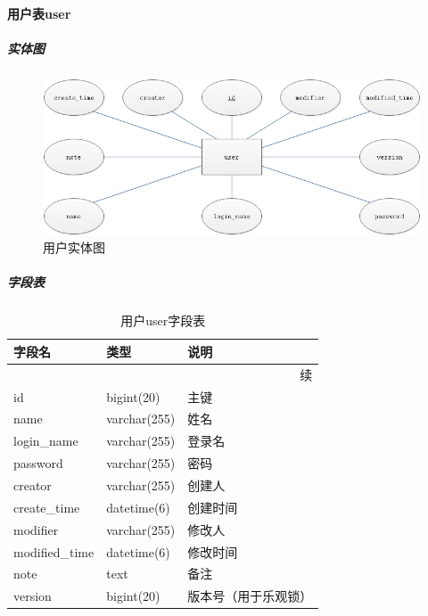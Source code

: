 \documentclass[titlepage,UTF8,linespread=1.5]{ctexart}
\begin{document}
\paragraph{用户表user}
\subparagraph{实体图}
\begin{figure}[H]
    \centering
    \includegraphics[width=140mm]{entity-user.png}
    \caption{用户实体图}
    \label{fig:entity-user}
\end{figure}
\subparagraph{字段表}
\begin{longtable}{|p{10em}|p{6em}|p{15em}|}
    \caption{用户user字段表}\label{tab:table_user}       \\\hline
    字段名         & 类型         & 说明                 \\\hline
    \endfirsthead
    \multicolumn{3}{r}{{续\tablename\thetable{}}}        \\\hline
    \endhead
    id             & bigint(20)   & 主键                 \\\hline
    name           & varchar(255) & 姓名                 \\\hline
    login\_name    & varchar(255) & 登录名               \\\hline
    password       & varchar(255) & 密码                 \\\hline
    creator        & varchar(255) & 创建人               \\\hline
    create\_time   & datetime(6)  & 创建时间             \\\hline
    modifier       & varchar(255) & 修改人               \\\hline
    modified\_time & datetime(6)  & 修改时间             \\\hline
    note           & text         & 备注                 \\\hline
    version        & bigint(20)   & 版本号（用于乐观锁） \\\hline
\end{longtable}\par
\end{document}
